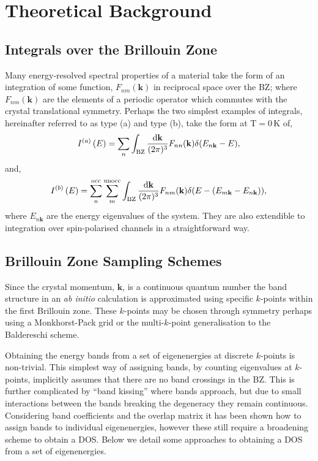 \documentclass[a4paper,11pt,twoside]{book}
\newcommand{\kbf}{\mathbf{k}}
\renewcommand{\d}{\mathrm{d}}
\begin{document}
\chapter{Theoretical Background} \label{sec:theory}

\section{Integrals over the Brillouin Zone}

Many energy-resolved spectral properties of a material take the form of an integration of some function, $F_{nm}(\kbf)$ in  reciprocal space over the BZ; where $F_{nm}(\kbf)$ are the elements of a periodic operator which commutes with the crystal translational symmetry.
%
Perhaps the two simplest examples of integrals, hereinafter referred to as type (a) and type (b), take the form at T$=0\,$K of,
\begin{equation}
I^{(a)} \left ( E \right) = \sum_n \int_{\rm BZ} \frac {\d\kbf}{(2\pi)^3} F_{nn}(\kbf) \delta (E_{n\kbf}-E),
\end{equation}
and,
\begin{equation}
I^{(b)} \left ( E \right) = \sum^{\rm occ}_n \sum^{\rm unocc}_m
\int_{\rm BZ} \frac {\d\kbf}{(2\pi)^3} F_{nm}(\kbf) \delta ( E - (E_{m\kbf}-E_{n\kbf})),
\label{Eqn:IntB}
\end{equation}
where $E_{n\kbf}$ are the energy eigenvalues of the system. 
%
They are also extendible to integration over spin-polarised channels
in a straightforward way.

\section{Brillouin Zone Sampling Schemes}

Since the crystal momentum, $\kbf$, is a continuous quantum number the band structure in an \emph{ab initio} calculation is approximated using specific $k$-points within the first Brillouin zone.
%
These $k$-points may be chosen through symmetry perhaps using a Monkhorst-Pack grid \cite{monkhorst:PRB:1976} or  the multi-$k$-point generalisation to the Baldereschi scheme\cite{rajagopal:PRL:1994,morris:PRB:2008}.


Obtaining the energy bands from a set of eigenenergies at discrete $k$-points is non-trivial. 
%
This simplest way of assigning bands, by counting eigenvalues at $k$-points, implicitly assumes that there are no band crossings in the BZ.
%
This is further complicated by ``band kissing'' where bands approach, but due to small interactions between the bands breaking the degeneracy they remain continuous\cite{blochl:PRB:1994,pickard:PRB:1999}.
%
Considering band coefficients and the overlap matrix it has been shown how to assign bands to individual eigenenergies\cite{yazyev:PRB:2002,refson:o2b}, however these still require a broadening scheme to obtain a DOS.
%
Below we detail some approaches to obtaining a DOS from a set of eigenenergies.
\end{document}
